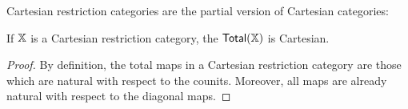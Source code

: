 Cartesian restriction categories are the partial version of Cartesian categories:
\begin{lemma} 
\label{prop:cartesian}
If $\mathbb{X}$ is a  Cartesian restriction category, the  $\mathsf{Total}(\mathbb{X})$ is Cartesian.
\end{lemma}
\begin{proof}
By definition, the total maps in a Cartesian restriction category are those which are natural with respect to the counits. Moreover, all maps are already natural with respect to the diagonal maps.
\end{proof}
%
%
%
%
%
%
%
%
%
%
%
%
%
%
%
%
%
